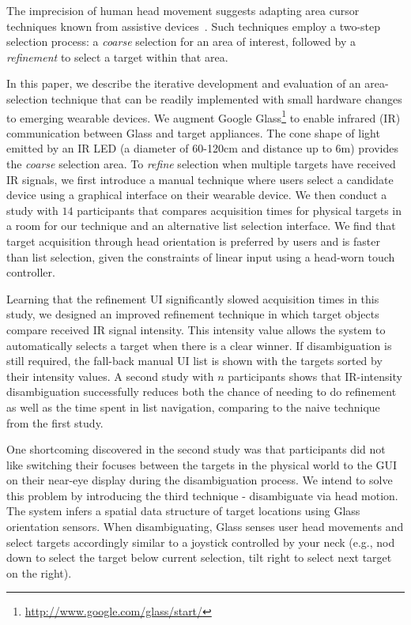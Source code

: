The imprecision of human head movement suggests adapting area cursor techniques known from assistive devices~\cite{kabbash1995prince,worden1997making,findlater2010enhanced}. Such techniques employ a two-step selection process: a {\em coarse} selection for an area of interest, followed by a {\em refinement} to select a target within that area.

In this paper, we describe the iterative development and evaluation of an area-selection technique that can be readily implemented with small hardware changes to emerging wearable devices. We augment Google Glass\footnote{\url{http://www.google.com/glass/start/}} to enable infrared (IR) communication between Glass and target appliances. The cone shape of light emitted by an IR LED (a diameter of 60-120cm and distance up to 6m) provides the {\em coarse} selection area. To {\em refine} selection when multiple targets have received IR signals, we first introduce a manual technique where users select a candidate device using a graphical interface on their wearable device.  We then conduct a study with $14$ participants that compares acquisition times for physical targets in a room for our technique and an alternative list selection interface. We find that target acquisition through head orientation is preferred by users and is faster than list selection, given the constraints of linear input using a head-worn touch controller. 

Learning that the refinement UI significantly slowed acquisition times in this study, we designed an improved refinement technique in which target objects compare received IR signal intensity. This intensity value allows the system to automatically selects a target when there is a clear winner. If disambiguation is still required, the fall-back manual UI list is shown with the targets sorted by their intensity values. A second study with $n$ participants shows that IR-intensity disambiguation successfully reduces both the chance of needing to do refinement as well as the time spent in list navigation, comparing to the naive technique from the first study.

One shortcoming discovered in the second study was that participants did not like switching their focuses between the targets in the physical world to the GUI on their near-eye display during the disambiguation process. We intend to solve this problem by introducing the third technique - disambiguate via head motion. The system infers a spatial data structure of target locations using Glass orientation sensors. When disambiguating, Glass senses user head movements and select targets accordingly similar to a joystick controlled by your neck (e.g., nod down to select the target below current selection, tilt right to select next target on the right).

